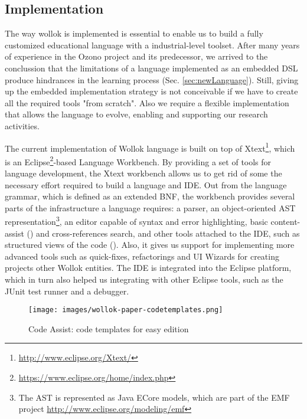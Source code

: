 \subsection{Implementation}
\label{sec:implementation}

The way wollok is implemented is essential to enable us to build a fully customized educational language with a industrial-level toolset.
After many years of experience in the Ozono project and its predecessor, we arrived to the conclussion that
the limitations of a language implemented as an embedded DSL \cite{Mern05a} produce hindrances in the learning process (\cf Sec. \ref{sec:newLanguage}).
Still, giving up the embedded implementation strategy is not conceivable if we have to create all the required tools "from scratch".
Also we require a flexible implementation that allows the language to evolve, enabling and supporting our research activities.

The current implementation of Wollok language is built on top of Xtext\footnote{\url{http://www.eclipse.org/Xtext/}}, 
which is an Eclipse\footnote{\url{https://www.eclipse.org/home/index.php}}-based Language Workbench\cite{fowler2005language}.
By providing a set of tools for language development, the Xtext workbench allows us to get rid of some the necessary effort required to build a language and IDE.
Out from the language grammar, which is defined as an extended BNF, the workbench provides several parts of the infrastructure a language requires: 
a parser, an object-oriented AST representation\footnote{The AST is represented as Java ECore models, which are part of the EMF project \url{http://www.eclipse.org/modeling/emf}}, 
an editor capable of syntax and error highlighting, basic content-assist (\cf {}) and cross-references search, 
and other tools attached to the IDE, such as structured views of the code (\cf {}).
Also, it gives us support for implementing more advanced tools such as quick-fixes, refactorings and UI Wizards for creating projects other Wollok entities.
The IDE is integrated into the Eclipse platform, which in turn also helped us integrating with other Eclipse tools, such as the JUnit test runner and a debugger.

\begin{figure}[ht]
    \centering
	\texttt{[image: images/wollok-paper-codetemplates.png]}
    \caption{Code Assist: code templates for easy edition}
    \label{fig:codetemplates.png}
\end{figure}

